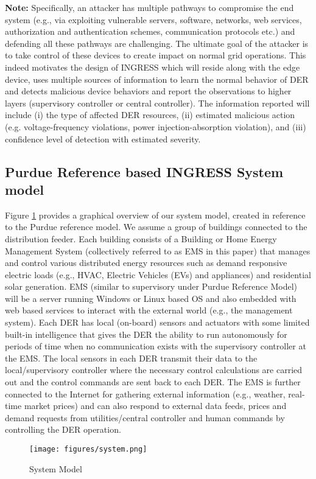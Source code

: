 \documentclass[conference]{IEEEtran}
\begin{document}
\textbf{Note:} Specifically, an attacker has multiple pathways to compromise the end system (e.g., via exploiting vulnerable servers, software, networks, web services, authorization and authentication schemes, communication protocols etc.) and defending all these pathways are challenging. The ultimate goal of the attacker is to take control of these devices to create impact on normal grid operations. This indeed motivates the design of INGRESS which will reside along with the edge device, uses multiple sources of information to learn the normal behavior of DER and detects malicious device behaviors and report the observations to higher layers (supervisory controller or central controller). The information reported will include (i) the type of affected
DER resources, (ii) estimated malicious action (e.g. voltage-frequency violations, power injection-absorption violation), and (iii) confidence level of detection with estimated severity.

\subsection{Purdue Reference based INGRESS System model} 
Figure \ref{system} provides a graphical overview of our system model, created in reference to the Purdue reference model. We assume a group of buildings connected to the distribution feeder. Each building consists of a Building or Home Energy Management System (collectively referred to as EMS in this paper) that manages and control various distributed energy resources such as demand responsive electric loads (e.g., HVAC, Electric Vehicles (EVs) and appliances) and residential solar generation. EMS (similar to supervisory under Purdue Reference Model) will be a server running Windows or Linux based OS and also embedded with web based services to interact with the external world (e.g., the management system). Each DER has local (on-board) sensors and actuators with some limited built-in intelligence that gives the DER the
ability to run autonomously for periods of time when no communication exists with the supervisory controller at the EMS. The local sensors in each DER transmit their data to the local/supervisory controller 
where the necessary control calculations are carried out and the control commands are sent back to each
DER. The EMS is further connected to the Internet for gathering external information (e.g., weather, real-time market prices) and can also respond to external data feeds, prices and demand requests from utilities/central controller and human commands by controlling the DER operation. 
\begin{figure}[h!]
	\centering
	\texttt{[image: figures/system.png]}
	\caption{System Model}
	\label{system}
\end{figure}
\end{document}
